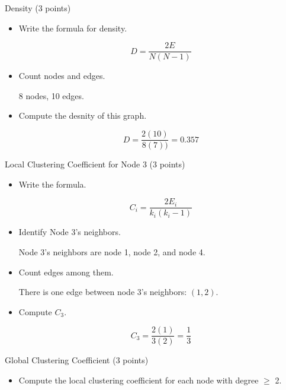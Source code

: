 \documentclass{article}
\begin{document}
\begin{enumerate}
    \item {
        Density (3 points)
        \begin{itemize}
            \item {
                Write the formula for density.

                \[D = \frac{2E}{N(N-1)}\]
            }

            \item {
                Count nodes and edges.

                8 nodes, 10 edges.
            }

            \item {
                Compute the desnity of this graph.

                \[D = \frac{2(10)}{8(7))} = 0.357\]
            }
        \end{itemize}
    }

    \item {
        Local Clustering Coefficient for Node 3 (3 points)

        \begin{itemize}
            \item {
                Write the formula.

                \[C_i = \frac{2E_i}{k_i(k_i-1)}\]
            }

            \item {
                Identify Node 3’s neighbors.

                Node 3's neighbors are node 1, node 2, and node 4.
            }

            \item {
                Count edges among them.

                There is one edge between node 3's neighbors: \((1,2)\).
            }

            \item {
                Compute \(C_3\).

                \[C_3 = \frac{2(1)}{3(2)} = \frac{1}{3}\]
            }
        \end{itemize}

        \item {
            Global Clustering Coefficient (3 points)

            \begin{itemize}
                \item {
                    Compute the local clustering coefficient for each node with 
                    degree \(\ge\) 2.

}
\end{itemize}}}
\end{enumerate}
\end{document}

